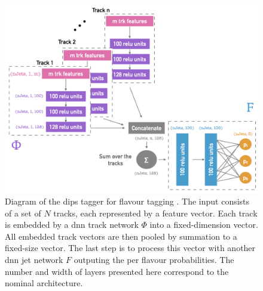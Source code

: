 \begin{figure}[h!]
  \center
  \includegraphics[scale=0.6]{Images/FTAG/dips_structure.png}
  \caption{Diagram of the \gls{dips} tagger for flavour tagging \cite{ATL-PHYS-PUB-2020-014}. The input consists of a set of $N$ tracks, each represented by a feature vector. Each track is embedded by a \gls{dnn} track network $\Phi$ into a fixed-dimension vector. All embedded track vectors are then pooled by summation to a fixed-size vector. The last step is to process this vector with another \gls{dnn} jet network $F$ outputing the per flavour probabilities. The number and width of layers presented here correspond to the nominal architecture.} 
  \label{fig:dipsModel}
\end{figure}

